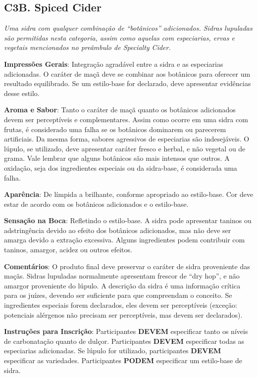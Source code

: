 \subsection*{C3B. Spiced Cider}

\textit{Uma sidra com qualquer combinação de “botânicos” adicionados. Sidras lupuladas são permitidas nesta categoria, assim como aquelas com especiarias, ervas e vegetais mencionados no preâmbulo de Specialty Cider.}

\textbf{Impressões Gerais}: Integração agradável entre a sidra e as especiarias adicionadas. O caráter de maçã deve se combinar aos botânicos para oferecer um resultado equilibrado. Se um estilo-base for declarado, deve apresentar evidências desse estilo.

\textbf{Aroma e Sabor}: Tanto o caráter de maçã quanto os botânicos adicionados devem ser perceptíveis e complementares. Assim como ocorre em uma sidra com frutas, é considerado uma falha se os botânicos dominarem ou parecerem artificiais. Da mesma forma, sabores agressivos de especiarias são indesejáveis. O lúpulo, se utilizado, deve apresentar caráter fresco e herbal, e não vegetal ou de grama. Vale lembrar que alguns botânicos são mais intensos que outros. A oxidação, seja dos ingredientes especiais ou da sidra-base, é considerada uma falha.

\textbf{Aparência}: De límpida a brilhante, conforme apropriado ao estilo-base. Cor deve estar de acordo com os botânicos adicionados e o estilo-base.

\textbf{Sensação na Boca}: Refletindo o estilo-base. A sidra pode apresentar taninos ou adstringência devido ao efeito dos botânicos adicionados, mas não deve ser amarga devido a extração excessiva. Alguns ingredientes podem contribuir com taninos, amargor, acidez ou outros efeitos.

\textbf{Comentários}: O produto final deve preservar o caráter de sidra proveniente das maçãs. Sidras lupuladas normalmente apresentam frescor de “dry hop”, e não amargor proveniente do lúpulo. A descrição da sidra é uma informação crítica para os juízes, devendo ser suficiente para que compreendam o conceito. Se ingredientes especiais forem declarados, eles devem ser perceptíveis (exceção: potenciais alérgenos não precisam ser perceptíveis, mas devem ser declarados).

\textbf{Instruções para Inscrição}: Participantes \textbf{DEVEM} especificar tanto os níveis de carbonatação quanto de dulçor. Participantes \textbf{DEVEM} especificar todas as especiarias adicionadas. Se lúpulo for utilizado, participantes \textbf{DEVEM} especificar as variedades. Participantes \textbf{PODEM} especificar um estilo-base de sidra.

